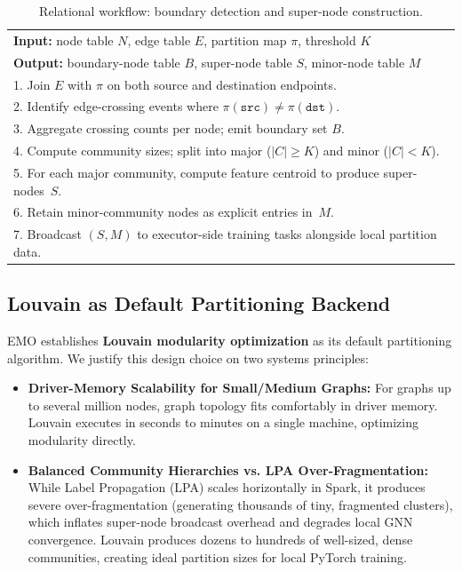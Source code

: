 \documentclass[conference,compsoc]{IEEEtran}
\begin{document}
\begin{table}[!t]
\caption{Relational workflow: boundary detection and super-node construction.}
\label{alg:boundary_supernode}
\centering
\begin{tabular}{p{}}
\toprule
\textbf{Input:} node table $N$, edge table $E$, partition map $\pi$, threshold $K$ \\
\textbf{Output:} boundary-node table $B$, super-node table $S$, minor-node table $M$ \\
\midrule
1. Join $E$ with $\pi$ on both source and destination endpoints. \\
2. Identify edge-crossing events where $\pi(\texttt{src})\neq\pi(\texttt{dst})$. \\
3. Aggregate crossing counts per node; emit boundary set $B$. \\
4. Compute community sizes; split into major ($|C|\ge K$) and minor ($|C|<K$). \\
5. For each major community, compute feature centroid to produce super-nodes~$S$. \\
6. Retain minor-community nodes as explicit entries in~$M$. \\
7. Broadcast $(S, M)$ to executor-side training tasks alongside local partition data. \\
\bottomrule
\end{tabular}
\end{table}

\subsection{Louvain as Default Partitioning Backend}
EMO establishes \textbf{Louvain modularity optimization} as its default partitioning algorithm. We justify this design choice on two systems principles:
\begin{itemize}
    \item \textbf{Driver-Memory Scalability for Small/Medium Graphs:} For graphs up to several million nodes, graph topology fits comfortably in driver memory. Louvain executes in seconds to minutes on a single machine, optimizing modularity directly.
    \item \textbf{Balanced Community Hierarchies vs. LPA Over-Fragmentation:} While Label Propagation (LPA) scales horizontally in Spark, it produces severe over-fragmentation (generating thousands of tiny, fragmented clusters), which inflates super-node broadcast overhead and degrades local GNN convergence. Louvain produces dozens to hundreds of well-sized, dense communities, creating ideal partition sizes for local PyTorch training.
\end{itemize}
\end{document}

